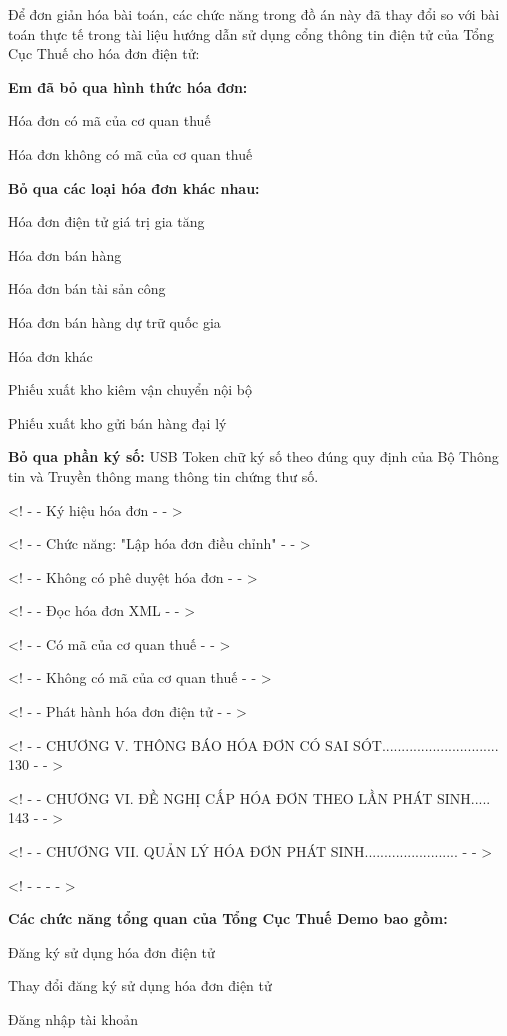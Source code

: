 Để đơn giản hóa bài toán, các chức năng trong đồ án này đã thay đổi so với bài toán thực tế trong tài liệu hướng dẫn sử dụng cổng thông tin điện tử của Tổng Cục Thuế cho hóa đơn điện tử:

\textbf{Em đã bỏ qua hình thức hóa đơn:}

Hóa đơn có mã của cơ quan thuế

Hóa đơn không có mã của cơ quan thuế

\textbf{Bỏ qua các loại hóa đơn khác nhau:}

Hóa đơn điện tử giá trị gia tăng

Hóa đơn bán hàng

Hóa đơn bán tài sản công

Hóa đơn bán hàng dự trữ quốc gia

Hóa đơn khác

Phiếu xuất kho kiêm vận chuyển nội bộ

Phiếu xuất kho gửi bán hàng đại lý

\textbf{Bỏ qua phần ký số:}
USB Token
chữ ký số theo đúng quy định của Bộ Thông tin và Truyền thông mang  thông tin chứng thư số.



<! - - Ký hiệu hóa đơn - - >

<! - - Chức năng: "Lập hóa đơn điều chỉnh" - - >

<! - - Không có phê duyệt hóa đơn - - >

<! - - Đọc hóa đơn XML - - >

<! - - Có mã của cơ quan thuế - - >

<! - - Không có mã của cơ quan thuế - - >

<! - - Phát hành hóa đơn điện tử - - >

<! - - CHƯƠNG V. THÔNG BÁO HÓA ĐƠN CÓ SAI SÓT.............................. 130 - - >

<! - - CHƯƠNG VI. ĐỀ NGHỊ CẤP HÓA ĐƠN THEO LẦN PHÁT SINH..... 143 - - >

<! - - CHƯƠNG VII. QUẢN LÝ HÓA ĐƠN PHÁT SINH........................ - - >

<! - - - - >

\textbf{Các chức năng tổng quan của Tổng Cục Thuế Demo bao gồm:}


Đăng ký sử dụng hóa đơn điện tử

Thay đổi đăng ký sử dụng hóa đơn điện tử

Đăng nhập tài khoản

